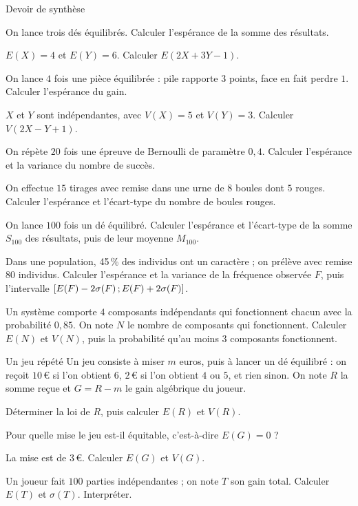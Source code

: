 \begin{exercice}[3]{Devoir de synthèse}
\begin{questions}
  \item On lance trois dés équilibrés. Calculer l'espérance de la somme des résultats.
  \item $E(X)=4$ et $E(Y)=6$. Calculer $E(2X+3Y-1)$.
  \item On lance $4$ fois une pièce équilibrée : pile rapporte $3$ points, face en fait perdre $1$. Calculer l'espérance du gain.
  \item $X$ et $Y$ sont indépendantes, avec $V(X)=5$ et $V(Y)=3$. Calculer $V(2X-Y+1)$.
  \item On répète $20$ fois une épreuve de Bernoulli de paramètre $0{,}4$. Calculer l'espérance et la variance du nombre de succès.
  \item On effectue $15$ tirages avec remise dans une urne de $8$ boules dont $5$ rouges. Calculer l'espérance et l'écart-type du
    nombre de boules rouges.
  \item On lance $100$ fois un dé équilibré. Calculer l'espérance et l'écart-type de la somme $S_{100}$ des résultats, puis de leur
    moyenne $M_{100}$.
  \item Dans une population, 45\,\% des individus ont un caractère ; on prélève avec remise $80$ individus. Calculer l'espérance et la
    variance de la fréquence observée $F$, puis l'intervalle $\mathopen{[}E(F)-2\sigma(F)\,{;}\,E(F)+2\sigma(F)\mathclose{]}$.
  \item Un système comporte $4$ composants indépendants qui fonctionnent chacun avec la probabilité $0{,}85$. On note $N$ le nombre de
    composants qui fonctionnent. Calculer $E(N)$ et $V(N)$, puis la probabilité qu'au moins $3$ composants fonctionnent.
\end{questions}
\end{exercice}

\begin{exercice}[3]{Un jeu répété}
Un jeu consiste à miser $m$ euros, puis à lancer un dé équilibré : on reçoit $10$\,€ si l'on obtient $6$, $2$\,€ si l'on obtient $4$
ou $5$, et rien sinon. On note $R$ la somme reçue et $G=R-m$ le gain algébrique du joueur.
\begin{questions}
  \item Déterminer la loi de $R$, puis calculer $E(R)$ et $V(R)$.
  \item Pour quelle mise le jeu est-il équitable, c'est-à-dire $E(G)=0$ ?
  \item La mise est de $3$\,€. Calculer $E(G)$ et $V(G)$.
  \item Un joueur fait $100$ parties indépendantes ; on note $T$ son gain total. Calculer $E(T)$ et $\sigma(T)$. Interpréter.
\end{questions}
\end{exercice}

